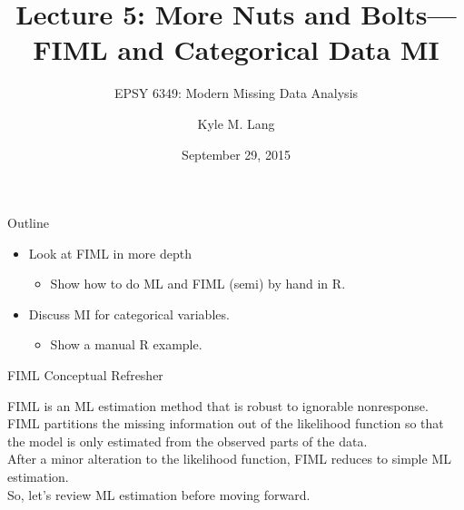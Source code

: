 \documentclass{beamer}
\title[Lecture 5]{Lecture 5: More Nuts and Bolts---FIML and Categorical Data MI}
\subtitle{EPSY 6349: Modern Missing Data Analysis}
\author{Kyle M. Lang}
\institute[TTU IMMAP]{
  Institute for Measurement, Methodology, Analysis \& Policy\\
  Texas Tech University\\
  Lubbock, TX
}
\date{September 29, 2015}
\begin{document}




{

  \begin{frame}[plain]

    \titlepage

  \end{frame}
}%



\begin{frame}{Outline}

  \begin{itemize}
  \item Look at FIML in more depth
    \vspace{12pt}
    \begin{itemize}
    \item Show how to do ML and FIML (semi) by hand in \textsf{R}.
    \end{itemize}
    \vspace{12pt}
  \item Discuss MI for categorical variables.
    \vspace{12pt}
    \begin{itemize}
    \item Show a manual \textsf{R} example.
    \end{itemize}
  \end{itemize}

\end{frame}


\begin{frame}{FIML Conceptual Refresher}

  FIML is an ML estimation method that is robust to ignorable
  nonresponse.\\
  \vspace{12pt}
  FIML partitions the missing information out of the
  likelihood function so that the model is only estimated from the
  observed parts of the data.\\
  \vspace{12pt}
  After a minor alteration to the likelihood function,
  FIML reduces to simple ML estimation.\\
  \vspace{12pt}
  So, let's review ML estimation before moving forward.

\end{frame}
\end{document}

